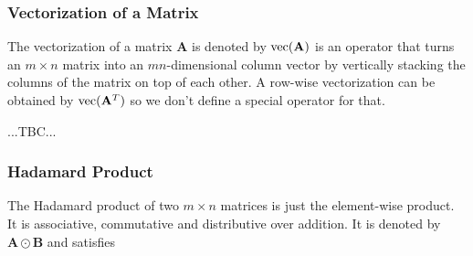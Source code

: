 
\subsubsection{Vectorization of a Matrix}
The vectorization of a matrix $\mathbf{A}$ is denoted by $\operatorname{vec}(\mathbf{A})$ is an operator that turns an $m \times n$ matrix into an $mn$-dimensional column vector by vertically stacking the columns of the matrix on top of each other. A row-wise vectorization can be obtained by $\operatorname{vec}(\mathbf{A}^T)$ so we don't define a special operator for that. 


...TBC...








\subsubsection{Hadamard Product} The Hadamard product of two $m \times n$ matrices is just the element-wise product. It is associative, commutative and distributive over addition. It is denoted by $\mathbf{A} \odot \mathbf{B}$ and satisfies

